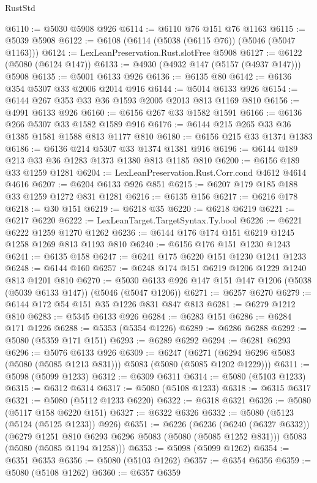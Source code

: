 \begin{lexlean}{RustStd}
\begin{coremodule}
@6110 := @5030 @5908 @926
@6114 := @6110 @76 @151 @76 @1163
@6115 := @5039 @5908
@6122 := @6108 (@6114 (@5038 (@6115 @76)) (@5046 (@5047 @1163)))
@6124 := LexLeanPreservation.Rust.slotFree @5908
@6127 := @6122 (@5080 (@6124 @147))
@6133 := @4930 (@4932 @147 (@5157 (@4937 @147))) @5908
@6135 := @5001 @6133 @926
@6136 := @6135 @80
@6142 := @6136 @354 @5307 @33 @2006 @2014 @916
@6144 := @5014 @6133 @926
@6154 := @6144 @267 @353 @33 @36 @1593 @2005 @2013 @813 @1169 @810
@6156 := @4991 @6133 @926
@6160 := @6156 @267 @33 @1582 @1591
@6166 := @6136 @266 @5307 @33 @1582 @1589 @916
@6176 := @6144 @215 @265 @33 @36 @1385 @1581 @1588 @813 @1177 @810
@6180 := @6156 @215 @33 @1374 @1383
@6186 := @6136 @214 @5307 @33 @1374 @1381 @916
@6196 := @6144 @189 @213 @33 @36 @1283 @1373 @1380 @813 @1185 @810
@6200 := @6156 @189 @33 @1259 @1281
@6204 := LexLeanPreservation.Rust.Corr.cond @4612 @4614 @4616
@6207 := @6204 @6133 @926 @851
@6215 := @6207 @179 @185 @188 @33 @1259 @1272 @831 @1281
@6216 := @6135 @156
@6217 := @6216 @178
@6218 := @30 @151
@6219 := @6218 @35
@6220 := @6218 @6219
@6221 := @6217 @6220
@6222 := LexLeanTarget.TargetSyntax.Ty.bool
@6226 := @6221 @6222 @1259 @1270 @1262
@6236 := @6144 @176 @174 @151 @6219 @1245 @1258 @1269 @813 @1193 @810
@6240 := @6156 @176 @151 @1230 @1243
@6241 := @6135 @158
@6247 := @6241 @175 @6220 @151 @1230 @1241 @1233
@6248 := @6144 @160
@6257 := @6248 @174 @151 @6219 @1206 @1229 @1240 @813 @1201 @810
@6270 := @5030 @6133 @926 @147 @151 @147 @1206 (@5038 (@5039 @6133 @147)) (@5046 (@5047 @1206))
@6271 := @6257 @6270
@6279 := @6144 @172 @54 @151 @35 @1226 @831 @847 @813
@6281 := @6279 @1212 @810
@6283 := @5345 @6133 @926
@6284 := @6283 @151
@6286 := @6284 @171 @1226
@6288 := @5353 (@5354 @1226)
@6289 := @6286 @6288
@6292 := @5080 (@5359 @171 @151)
@6293 := @6289 @6292
@6294 := @6281 @6293
@6296 := @5076 @6133 @926
@6309 := @6247
    (@6271 (@6294 @6296 @5083 (@5080 (@5085 @1213 @831))) @5083 (@5080 (@5085 @1202 @1229)))
@6311 := @5098 (@5099 @1233)
@6312 := @6309 @6311
@6314 := @5080 (@5103 @1233)
@6315 := @6312 @6314
@6317 := @5080 (@5108 @1233)
@6318 := @6315 @6317
@6321 := @5080 (@5112 @1233 @6220)
@6322 := @6318 @6321
@6326 := @5080 (@5117 @158 @6220 @151)
@6327 := @6322 @6326
@6332 := @5080 (@5123 (@5124 (@5125 @1233)) @926)
@6351 := @6226
    (@6236
      (@6240 (@6327 @6332))
      (@6279 @1251 @810 @6293 @6296 @5083 (@5080 (@5085 @1252 @831)))
      @5083
      (@5080 (@5085 @1194 @1258)))
@6353 := @5098 (@5099 @1262)
@6354 := @6351 @6353
@6356 := @5080 (@5103 @1262)
@6357 := @6354 @6356
@6359 := @5080 (@5108 @1262)
@6360 := @6357 @6359

\end{coremodule}
\end{lexlean}
